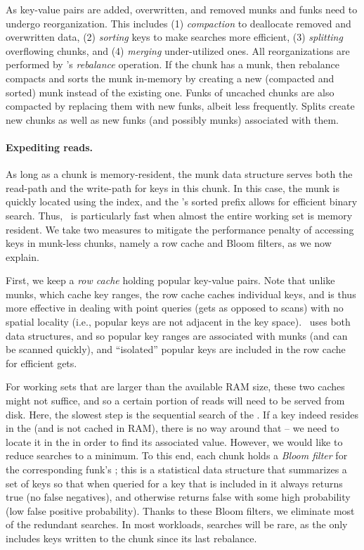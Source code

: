 As key-value pairs are added, overwritten, and removed munks and funks need to undergo reorganization. This includes  
(1) \emph{compaction} to deallocate removed and overwritten data, 
(2) \emph{sorting} keys to make searches more efficient,  
(3) \emph{splitting} overflowing chunks, and
(4) \emph{merging} under-utilized ones.
All reorganizations are performed by \sys's \emph{rebalance} operation.
If the chunk has a munk, then rebalance compacts and sorts the munk in-memory by creating a new 
(compacted and sorted) munk instead of the existing one. 
Funks of uncached chunks are also compacted by replacing them with new funks, albeit less frequently.
Splits  create new chunks as well as new  funks (and possibly munks) associated with them.

\paragraph{Expediting reads.}
As long as a chunk  is memory-resident, the munk data structure serves both the read-path and the write-path for keys in this chunk. 
In this case, the munk is quickly located using the index, and the  's sorted prefix allows for efficient binary search.
Thus, \sys\ is particularly fast when almost the entire working set is memory resident. 
We take two measures to mitigate the performance penalty of accessing keys in munk-less   chunks, namely 
a row cache and Bloom filters, as we now explain.

First, we keep a \emph{row cache} holding popular key-value pairs. Note that unlike munks, which cache key ranges, the row
cache caches individual keys, and is thus more effective in dealing with point queries (gets as opposed to scans) with no
spatial locality (i.e., popular keys are not adjacent in the key space). \sys\ uses both data structures, and so 
popular key ranges are associated with munks (and can be scanned quickly), 
and  ``isolated'' popular keys are included in the row cache for efficient gets.

For working sets that are  larger than the available RAM size, these two caches might not suffice, and so a certain portion of reads will need to be served from disk. Here, the slowest step is the sequential search of the . 
If a key indeed resides in the 
 (and is not cached in RAM), there is no way around that -- we need to locate it in the  in order to find 
its associated value. However, we would like to reduce  searches to a minimum. 
To this end, each chunk holds a \emph{Bloom filter} for the corresponding funk's ; 
this is a statistical data structure that summarizes a set of keys so that 
when queried for a key that is included in it always returns true (no false negatives), 
and otherwise returns false with some high probability (low false positive probability). 
Thanks to these Bloom filters, we eliminate most of the redundant   searches.
In most workloads,   searches will be rare, as the   only includes keys written to the chunk 
since its last rebalance.



